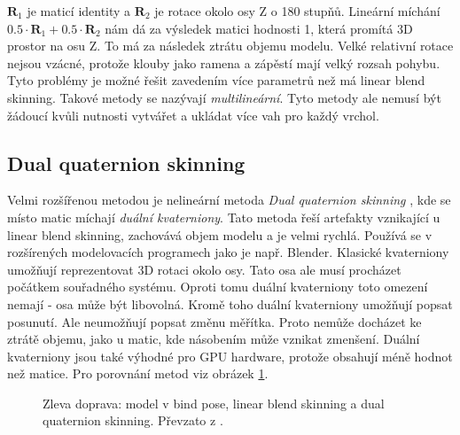   $\mathbf{R}_1$ je maticí identity a $\mathbf{R}_2$ je rotace okolo osy Z o 180 stupňů. Lineární míchání $0.5 \cdot \mathbf{R}_1 + 0.5 \cdot \mathbf{R}_2$ nám dá za výsledek matici hodnosti 1, která promítá 3D prostor na osu Z. To má za následek ztrátu objemu modelu. Velké relativní rotace nejsou vzácné, protože klouby jako ramena a zápěstí mají velký rozsah pohybu. Tyto problémy je možné řešit zavedením více parametrů než má linear blend skinning. Takové metody se nazývají \textit{multilineární}. Tyto metody ale nemusí být žádoucí kvůli nutnosti vytvářet a ukládat více vah pro každý vrchol.

\subsection{Dual quaternion skinning}
Velmi rozšířenou metodou je nelineární metoda \textit{Dual quaternion skinning} \cite{dualQuat}, kde se místo matic míchají \textit{duální kvaterniony}. Tato metoda řeší artefakty vznikající u linear blend skinning, zachovává objem modelu a je velmi rychlá. Používá se v rozšírených modelovacích programech jako je např. Blender. Klasické kvaterniony umožňují reprezentovat 3D rotaci okolo osy. Tato osa ale musí procházet počátkem souřadného systému. Oproti tomu duální kvaterniony toto omezení nemají - osa může být libovolná. Kromě toho duální kvaterniony umožňují popsat posunutí. Ale neumožňují popsat změnu měřítka. Proto nemůže docházet ke ztrátě objemu, jako u matic, kde násobením může vznikat zmenšení. Duální kvaterniony jsou také výhodné pro GPU hardware, protože obsahují méně hodnot než matice. Pro porovnání metod viz obrázek \ref{skinning_methods}.

\begin{figure}[h]
\begin{center}
\caption{Zleva doprava: model v bind pose, linear blend skinning a dual quaternion skinning. Převzato z \cite{skinningMethods}.} \label{skinning_methods}
\end{center}
\end{figure}

